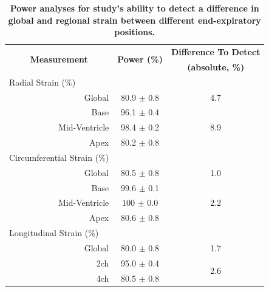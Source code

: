 	\begin{table}
		\centering
		\caption[Power analyses for study's ability to detect a difference in global and regional strain between different end-expiratory positions]{\textbf{Power analyses for study's ability to detect a difference in global and regional strain between different end-expiratory positions.}}
		\label{table:strainDifferencesPower}
		\begin{tabular}{c c c}
			\toprule
			\multirow{2}{*}{\textbf{Measurement}} & \multirow{2}{*}{\textbf{Power (\%)}} & \textbf{Difference To Detect}  \\
			 & & \textbf{(absolute, \%)}\\
			\midrule
			\multicolumn{1}{l}{Radial Strain (\%)} & &                                 \\
			\multicolumn{1}{r}{Global}  	  & 80.9 $\pm$ 0.8 & 4.7                   \\
			\multicolumn{1}{r}{Base}  		  & 96.1 $\pm$ 0.4 & \multirow{3}{*}{8.9}  \\
			\multicolumn{1}{r}{Mid-Ventricle} & 98.4 $\pm$ 0.2 &                       \\
			\multicolumn{1}{r}{Apex}  		  & 80.2 $\pm$ 0.8 &                       \\
			\multicolumn{1}{l}{Circumferential Strain (\%)} & &                        \\
			\multicolumn{1}{r}{Global}  	  & 80.5 $\pm$ 0.8 & 1.0                   \\
			\multicolumn{1}{r}{Base}  		  & 99.6 $\pm$ 0.1 & \multirow{3}{*}{2.2}  \\
			\multicolumn{1}{r}{Mid-Ventricle} & 100 $\pm$ 0.0  &                       \\
			\multicolumn{1}{r}{Apex}  		  & 80.6 $\pm$ 0.8 &                       \\
			\multicolumn{1}{l}{Longitudinal Strain (\%)} & & 	    				   \\
			\multicolumn{1}{r}{Global}        & 80.0 $\pm$ 0.8 &  1.7                  \\
			\multicolumn{1}{r}{2ch}  		  & 95.0 $\pm$ 0.4 &  \multirow{2}{*}{2.6} \\
			\multicolumn{1}{r}{4ch}  		  & 80.5 $\pm$ 0.8 &     				   \\ 
			\bottomrule
		\end{tabular}
	\end{table}

